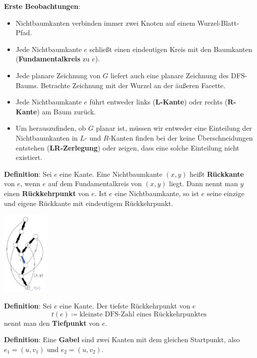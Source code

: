 \textbf{Erste Beobachtungen}:
\begin{itemize}
	\item Nichtbaumkanten verbinden immer zwei Knoten auf einem Wurzel-Blatt-Pfad.
	\item Jede Nichtbaumkante $e$ schließt einen eindeutigen Kreis mit den Baumkanten (\textbf{Fundamentalkreis} zu $e$).
	\item Jede planare Zeichnung von $G$ liefert auch eine planare Zeichnung des DFS-Baums. Betrachte Zeichnung mit der Wurzel an der äußeren Facette.
	\item Jede Nichtbaumkante $e$ führt entweder links (\textbf{$\mathbf{L}$-Kante}) oder rechts (\textbf{$\mathbf{R}$-Kante}) am Baum zurück.
	\item Um herauszufinden, ob $G$ planar ist, müssen wir entweder eine Einteilung der Nichtbaumkanten in $L$- und $R$-Kanten finden bei der keine Überschneidungen entstehen (\textbf{LR-Zerlegung}) oder zeigen, dass eine solche Einteilung nicht existiert.
\end{itemize}
\bigskip
\textbf{Definition}: Sei $e$ eine Kante. Eine Nichtbaumkante $(x, y)$ heißt \textbf{Rückkante} von $e$, wenn $e$ auf dem Fundamentalkreis von $(x, y)$ liegt. Dann nennt man $y$ einen \textbf{Rückkehrpunkt} von $e$. Ist $e$ eine Nichtbaumkante, so ist $e$ seine einzige und eigene Rückkante mit eindeutigem Rückkehrpunkt.
\begin{center}
	\includegraphics[width=0.17\textwidth]{images/back-edge.png}
\end{center}

\textbf{Definition}: Sei $e$ eine Kante. Der tiefste Rückkehrpunkt von $e$
$$t(e)\coloneqq \text{kleinste DFS-Zahl eines Rückkehrpunktes}$$ nennt man den \textbf{Tiefpunkt} von $e$.

\textbf{Definition}: Eine \textbf{Gabel} sind zwei Kanten mit dem gleichen Startpunkt, also $e_1=(u,v_1)$ und $e_2=(u,v_2)$.

